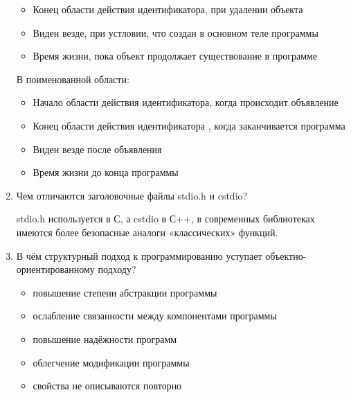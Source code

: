 \documentclass[14pt]{extarticle}
\begin{document}
\begin{enumerate}
\begin{itemize}
		      \item Конец области действия идентификатора, при удалении объекта
		      \item Виден везде, при устловии, что создан в основном теле программы
		      \item Время жизни, пока объект продолжает существование в программе
	      \end{itemize}
	      В поименованной области:
	      \begin{itemize}
		      \item Начало области действия идентификатора, когда происходит объявление
		      \item Конец области действия идентификатора , когда заканчивается программа
		      \item Виден везде после объявления
		      \item Время жизни до конца программы
	      \end{itemize}
	\item Чем отличаются заголовочные файлы stdio.h и cstdio?

	      stdio.h используется в С, а cstdio в С++, в современных библиотеках имеются более безопасные аналоги «классических» функций.

	\item В чём структурный подход к программированию уступает объектно-ориентированному подходу?
	      \begin{itemize}
		      \item повышение степени абстракции программы
		      \item ослабление связанности между компонентами программы
		      \item повышение надёжности программ
		      \item облегчение модификации программы
		      \item свойства не описываются повторно
	      \end{itemize}
\end{enumerate}
\end{document}
